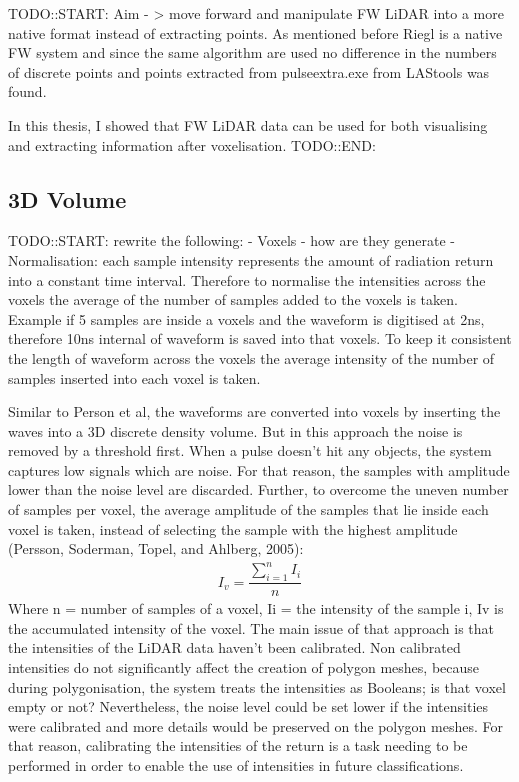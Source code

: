 \documentclass{subfiles}
\begin{document}
TODO::START:\newline
Aim - > move forward and manipulate FW LiDAR into a more native format instead of extracting points. As mentioned before Riegl is a native FW system and since the same algorithm are used no difference in the numbers of discrete points and points extracted from pulseextra.exe from LAStools was found.

In this thesis, I showed that FW LiDAR data can be used for both visualising and extracting information after voxelisation. 
TODO::END:\newline

\subsection{3D Volume}
TODO::START:\newline
rewrite the following:
- Voxels - how are they generate
- Normalisation: each sample intensity represents the amount of radiation return into a constant time interval. Therefore to normalise the intensities across the voxels the average of the number of samples added to the voxels is taken. Example if 5 samples are inside a voxels and the waveform is digitised at 2ns, therefore 10ns internal of waveform is saved into that voxels. To keep it consistent the length of waveform across the voxels the average intensity of the number of samples inserted into each voxel is taken. 

Similar to Person et al, the waveforms are converted into voxels by inserting the waves into a 3D discrete density volume. But in this approach the noise is removed by a threshold first. When a pulse doesn’t hit any objects, the system captures low signals which are noise. For that reason, the samples with amplitude lower than the noise level are discarded. Further, to overcome the uneven number of samples per voxel, the average amplitude of the samples that lie inside each voxel is taken, instead of selecting the sample with the highest amplitude (Persson, Soderman, Topel, and Ahlberg, 2005):
	\begin{eqnarray}
		I_{v} = \dfrac{\sum_{i=1}^{n}I_{i}}{n}
	\end{eqnarray} 
Where 	n = number of samples of a voxel, 
	Ii = the intensity of the sample i, 
	Iv is the accumulated intensity of the voxel.  
The main issue of that approach is that the intensities of the LiDAR data haven’t been calibrated. Non calibrated intensities do not significantly affect the creation of polygon meshes, because during polygonisation, the system treats the intensities as Booleans; is that voxel empty or not? Nevertheless, the noise level could be set lower if the intensities were calibrated and more details would be preserved on the polygon meshes. For that reason, calibrating the intensities of the return is a task needing to be performed in order to enable the use of intensities in future classifications. 
\end{document}
